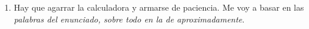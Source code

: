 \begin{enumerate}[label=(\alph*)]
$$\begin{array}{rcl}
            \matriz{cccc}{
            0                  & 0            & 0               & 1                \\
            \frac{2}{7}        & \frac{2}{7}  & \frac{2}{7}     & 0                \\
            0                  & \frac{-1}{2} & \frac{1}{2}     & 0                \\
            \frac{-2}{7}       & \frac{3}{14} & \frac{3}{14}    & 0
            }                                                                      \\
                               & =            &
            \matriz{cccc}{
            \frac{3}{7}        & \frac{3}{7}  & \frac{3}{7}     & 0                \\
            \frac{2}{7}        & \frac{2}{7}  & \frac{2}{7}     & 0                \\
            \frac{2}{7}        & \frac{2}{7}  & \frac{2}{7}     & 0                \\
            0                  & 0            & 0               & 1
            }
            = P^\infinito
          \end{array}
        $$

  \item Hay que agarrar la calculadora y armarse de paciencia. Me voy a basar en las
        \textit{palabras del enunciado, sobre todo en la de aproximadamente}.


\end{enumerate}
